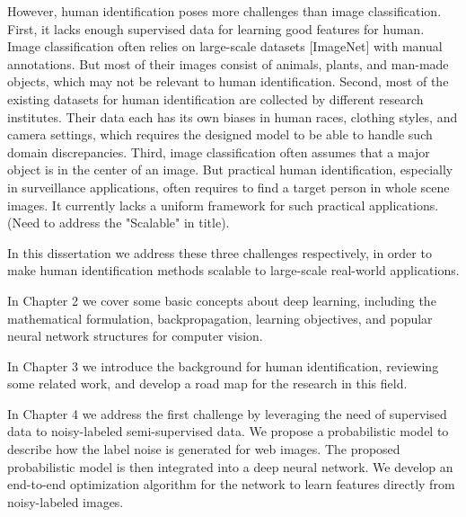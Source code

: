 However, human identification poses more challenges than image classification. First, it lacks enough supervised data for learning good features for human. Image classification often relies on large-scale datasets [ImageNet] with manual annotations. But most of their images consist of animals, plants, and man-made objects, which may not be relevant to human identification. Second, most of the existing datasets for human identification are collected by different research institutes. Their data each has its own biases in human races, clothing styles, and camera settings, which requires the designed model to be able to handle such domain discrepancies. Third, image classification often assumes that a major object is in the center of an image. But practical human identification, especially in surveillance applications, often requires to find a target person in whole scene images. It currently lacks a uniform framework for such practical applications.
(Need to address the "Scalable" in title).


In this dissertation we address these three challenges respectively, in order to make human identification methods scalable to large-scale real-world applications.

In Chapter 2 we cover some basic concepts about deep learning, including the mathematical formulation, backpropagation, learning objectives, and popular neural network structures for computer vision.

In Chapter 3 we introduce the background for human identification, reviewing some related work, and develop a road map for the research in this field.

In Chapter 4 we address the first challenge by leveraging the need of supervised data to noisy-labeled semi-supervised data. We propose a probabilistic model to describe how the label noise is generated for web images. The proposed probabilistic model is then integrated into a deep neural network. We develop an end-to-end optimization algorithm for the network to learn features directly from noisy-labeled images.

